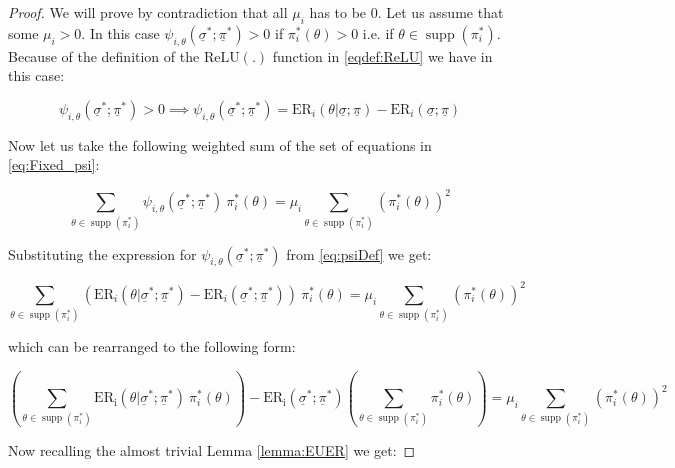 \documentclass{article}
\theoremstyle{definition}
\DeclareMathOperator\supp{supp}
\begin{document}
\begin{proof}
We will prove by contradiction that all $\mu_i$ has to be $0$.
Let us assume that some $\mu_i > 0$. In this case $\psi_{i,\theta}(\underline{\sigma}^*;\underline{\pi}^*) > 0$ if $\pi_i^*(\theta) > 0$ i.e. if $\theta \in \supp(\pi_i^*)$. Because of the definition of the $\mathrm{ReLU}(.)$ function in \eqref{eqdef:ReLU} we have in this case:


\begin{equation}
    \psi_{i,\theta}(\underline{\sigma}^*;\underline{\pi}^*) > 0
    \implies
    \psi_{i,\theta}(\underline{\sigma}^*;\underline{\pi}^*)
    =
    \mathrm{ER}_i(\theta | \underline{\sigma};\underline{\pi})
    -
    \mathrm{ER}_i(\underline{\sigma};\underline{\pi})
\end{equation}

Now let us take the following weighted sum of the set of equations in \eqref{eq:Fixed_psi}:

\begin{equation}
    \sum_{\theta \in \supp(\pi_i^*)} \psi_{i,\theta}(\underline{\sigma}^*;\underline{\pi}^*)
    \ \pi_i^*(\theta)
    =
    \mu_i
    \sum_{\theta \in \supp(\pi_i^*)} \left ( \pi_i^*(\theta) \right )^2
\end{equation}

Substituting the expression for $\psi_{i,\theta}(\underline{\sigma}^*;\underline{\pi}^*)$ from \eqref{eq:psiDef} we get:

\begin{equation}
    \sum_{\theta \in \supp(\pi_i^*)} 
    \left (
    \mathrm{ER}_i(\theta | \underline{\sigma}^*;\underline{\pi}^*)
    -
    \mathrm{ER}_i(\underline{\sigma}^*;\underline{\pi}^*)
    \right )
    \ \pi_i^*(\theta) 
    =
    \mu_i
    \sum_{\theta \in \supp(\pi_i^*)} \left ( \pi_i^*(\theta) \right )^2
\end{equation}

which can be rearranged to the following form:

\begin{equation}
    \left (
    \sum_{\theta \in \supp(\pi_i^*)} 
    \mathrm{ER_i}(\theta|\underline{\sigma}^*;\underline{\pi}^*)
    \ \pi_i^*(\theta) 
    \right )
    -
    \mathrm{ER_i}(\underline{\sigma}^*;\underline{\pi}^*)
    \left (
    \sum_{\theta \in \supp(\pi_i^*)} \pi_i^*(\theta) 
    \right )
    =
    \mu_i
    \sum_{\theta \in \supp(\pi_i^*)} \left ( \pi_i^*(\theta) \right )^2
\end{equation}

Now recalling the almost trivial Lemma \autoref{lemma:EUER} we get:



\end{proof}
\end{document}
